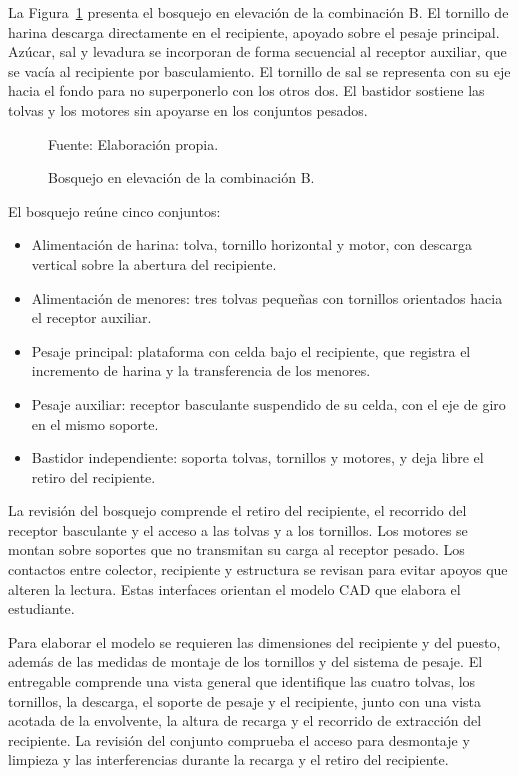 La Figura~\ref{fig:disposicion_concepto_b} presenta el bosquejo en
elevación de la combinación B. El tornillo de harina descarga
directamente en el recipiente, apoyado sobre el pesaje principal.
Azúcar, sal y levadura se incorporan de forma secuencial al receptor
auxiliar, que se vacía al recipiente por basculamiento. El tornillo de
sal se representa con su eje hacia el fondo para no superponerlo con
los otros dos. El bastidor sostiene las tolvas y los motores sin
apoyarse en los conjuntos pesados.

\begin{figure}[H]
    \centering
    \resizebox{\textwidth}{!}{}
    \caption{Bosquejo en elevación de la combinación B.}
    \label{fig:disposicion_concepto_b}
    {\footnotesize Fuente: Elaboración propia.}
\end{figure}

El bosquejo reúne cinco conjuntos:

\begin{itemize}
    \item Alimentación de harina: tolva, tornillo horizontal y motor, con
    descarga vertical sobre la abertura del recipiente.
    \item Alimentación de menores: tres tolvas pequeñas con tornillos
    orientados hacia el receptor auxiliar.
    \item Pesaje principal: plataforma con celda bajo el recipiente, que
    registra el incremento de harina y la transferencia de los menores.
    \item Pesaje auxiliar: receptor basculante suspendido de su celda,
    con el eje de giro en el mismo soporte.
    \item Bastidor independiente: soporta tolvas, tornillos y motores, y
    deja libre el retiro del recipiente.
\end{itemize}

La revisión del bosquejo comprende el retiro del recipiente, el recorrido
del receptor basculante y el acceso a las tolvas y a los tornillos.
Los motores se montan sobre soportes que no transmitan su carga al
receptor pesado. Los contactos entre colector, recipiente y estructura
se revisan para evitar apoyos que alteren la lectura. Estas interfaces
orientan el modelo CAD que elabora el estudiante.

Para elaborar el modelo se requieren las dimensiones del recipiente y del
puesto, además de las medidas de montaje de los tornillos y del sistema
de pesaje. El entregable comprende una vista general que identifique las
cuatro tolvas, los tornillos, la descarga, el soporte de pesaje y el
recipiente, junto con una vista acotada de la envolvente, la altura de recarga
y el recorrido de extracción del recipiente. La revisión del conjunto
comprueba el acceso para desmontaje y limpieza y las interferencias
durante la recarga y el retiro del recipiente.

